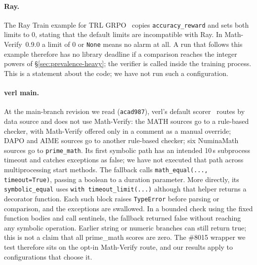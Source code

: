 \documentclass[10pt,a4paper]{article}
\let\cite\citep
\newcommand{\mv}{Math-Verify}
\begin{document}
\paragraph{Ray.} The Ray Train example for TRL GRPO~\citep{raytrl} copies
\texttt{accuracy\_reward} and sets both limits to $0$, stating that the
default limits are incompatible with Ray. In \mv{}~0.9.0 a limit of $0$ or
\texttt{None} means no alarm at all. A run that follows this example therefore
has no library deadline if a comparison reaches the integer powers of
\S\ref{sec:prevalence-heavy}; the verifier is called inside the training
process. This is a statement about the code; we have not run such a
configuration.

\paragraph{verl main.} At the main-branch revision we read (\texttt{acad987}),
verl's default scorer~\cite{verlmain} routes by data source and does not use \mv{}: the
MATH sources go to a rule-based checker, with \mv{} offered only in a comment
as a manual override; DAPO and AIME sources go to another rule-based checker;
six NuminaMath sources go to \texttt{prime\_math}. Its first symbolic path
has an intended 10\,s subprocess timeout and catches exceptions as false;
we have not executed that path across multiprocessing start methods.
The fallback calls \texttt{math\_equal(..., timeout=True)}, passing a
boolean to a duration parameter. More directly, its \texttt{symbolic\_equal}
uses \texttt{with timeout\_limit(...)} although that helper returns a
decorator function. Each such block raises \texttt{TypeError} before parsing
or comparison, and the exceptions are swallowed. In a bounded check using
the fixed function bodies and call sentinels, the fallback returned false
without reaching any symbolic operation. Earlier string or numeric branches
can still return true; this is not a claim that all prime\_math scores are
zero. The \#8015 wrapper we test therefore sits on the
opt-in \mv{} route, and our results apply to configurations that choose it.
\end{document}
